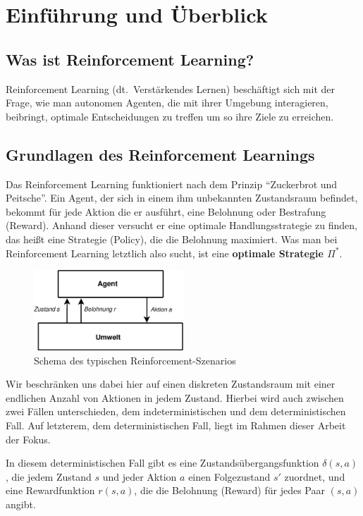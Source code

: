 \section{Einführung und Überblick}
\subsection{Was ist Reinforcement Learning?}
Reinforcement Learning (dt.\ Verstärkendes Lernen) beschäftigt sich mit der 
Frage, wie man autonomen Agenten, die mit ihrer Umgebung interagieren, 
beibringt, optimale Entscheidungen zu treffen um so ihre Ziele zu erreichen.

\subsection{Grundlagen des Reinforcement Learnings}
Das Reinforcement Learning funktioniert nach dem Prinzip "`Zuckerbrot und 
Peitsche"'. Ein Agent, der sich in einem ihm unbekannten Zustandsraum befindet, 
bekommt für jede Aktion die er ausführt, eine Belohnung oder Bestrafung 
(Reward). Anhand dieser versucht er eine optimale Handlungsstrategie zu finden, 
das heißt eine Strategie (Policy), die die Belohnung maximiert. Was man bei 
Reinforcement Learning letztlich also sucht, ist eine \textbf{optimale 
Strategie $\Pi^*$}.

\begin{figure}
  \centering
  \includegraphics[width=0.5\textwidth]{../images/Agent_Umwelt.eps}
  \caption{Schema des typischen Reinforcement-Szenarios}
\end{figure}

\par Wir beschränken uns dabei hier auf einen diskreten Zustandsraum mit einer 
endlichen Anzahl von Aktionen in jedem Zustand. Hierbei wird auch zwischen zwei 
Fällen unterschieden, dem indeterministischen und dem deterministischen Fall. 
Auf letzterem, dem deterministischen Fall, liegt im Rahmen dieser Arbeit der 
Fokus.

\par In diesem deterministischen Fall gibt es eine Zustandsübergangsfunktion 
$\delta(s,a)$, die jedem Zustand $s$ und jeder Aktion $a$ einen Folgezustand 
$s'$ zuordnet, und eine Rewardfunktion $r(s,a)$, die die Belohnung (Reward) für 
jedes Paar $(s,a)$ angibt.

